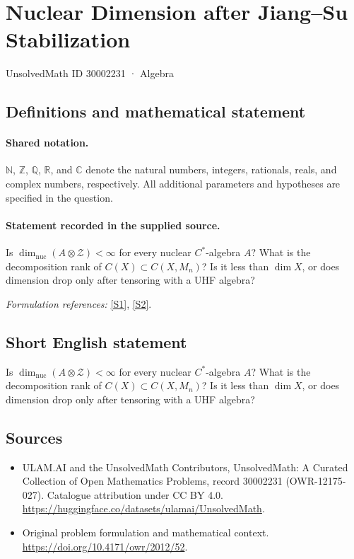\documentclass[11pt]{article}
\newcommand{\sref}[2]{\hyperlink{source:#1:#2}{[S#2]}}
\begin{document}
\setcounter{section}{30002230}
\section{Nuclear Dimension after Jiang–Su Stabilization}\label{30002231}
{\small UnsolvedMath ID 30002231 · Algebra}
\subsection{Definitions and mathematical statement}

\paragraph{Shared notation.}$\mathbb N$, $\mathbb Z$, $\mathbb Q$, $\mathbb R$, and $\mathbb C$ denote the natural numbers, integers, rationals, reals, and complex numbers, respectively. All additional parameters and hypotheses are specified in the question.


\paragraph{Statement recorded in the supplied source.}
Is $\operatorname{dim}_{\mathrm{nuc}}(A\otimes\mathcal Z)<\infty$ for every nuclear $C^*$-algebra $A$? What is the decomposition rank of $C(X)\subset C(X,M_n)$? Is it less than $\dim X$, or does dimension drop only after tensoring with a UHF algebra?
\par\smallskip\textit{Formulation references:} \sref{30002231}{1}, \sref{30002231}{2}.
\subsection{Short English statement}
Is $\operatorname{dim}_{\mathrm{nuc}}(A\otimes\mathcal Z)<\infty$ for every nuclear $C^*$-algebra $A$? What is the decomposition rank of $C(X)\subset C(X,M_n)$? Is it less than $\dim X$, or does dimension drop only after tensoring with a UHF algebra?
\subsection{Sources}
\begin{itemize}
\item[\hypertarget{source:30002231:1}{S1}] ULAM.AI and the UnsolvedMath Contributors, UnsolvedMath: A Curated Collection of Open Mathematics Problems, record 30002231 (OWR-12175-027). Catalogue attribution under CC BY 4.0.
\url{https://huggingface.co/datasets/ulamai/UnsolvedMath}.
\item[\hypertarget{source:30002231:2}{S2}] Original problem formulation and mathematical context.
\url{https://doi.org/10.4171/owr/2012/52}.
\end{itemize}
\label{end:30002231}
\end{document}

